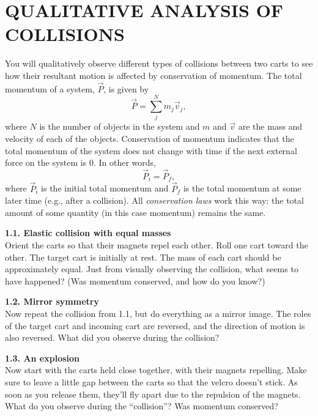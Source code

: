 \documentclass[11pt,letterpaper]{article}
\begin{document}
\section{QUALITATIVE ANALYSIS OF COLLISIONS}
You will qualitatively observe different types of collisions between two carts to see how their resultant motion is affected by conservation of momentum. The total momentum of a system, $\vec P$, is given by
$$\vec P=\displaystyle\sum_j^N{m_j\vec v_j},$$
where $N$ is the number of objects in the system and $m$ and $\vec v$ are the mass and velocity of each of the objects. Conservation of momentum indicates that the total momentum of the system does not change with time if the next external force on the system is 0. In other words, 
$$\vec P_i = \vec P_f,$$
where $\vec P_i$ is the initial total momentum and $\vec P_f$ is the total momentum at some later time (e.g., after a collision). %
All \textit{conservation laws} work this way: the total amount of some quantity (in this case momentum) remains the same.


{\bf 1.1. Elastic collision with equal masses}\\ 
Orient the carts so that their magnets repel each other. Roll one cart toward the other. The target cart is initially at rest. The mass of each cart should be approximately equal. Just from visually observing the collision, what seems to have happened? (Was momentum conserved, and how do you know?)

{\bf 1.2. Mirror symmetry}\\
Now repeat the collision from 1.1, but do everything as a mirror image.  The roles of the target cart and incoming cart are reversed, and the direction of motion is also reversed.  What did you observe during the collision?  

{\bf 1.3. An explosion}\\
Now start with the carts held close together, with their magnets repelling. Make sure to leave a little gap between the carts so that the velcro doesn't stick. As soon as you release them, they'll fly apart due to the repulsion of the magnets.  What do you observe during the ``collision''? Was momentum conserved?
\end{document}
